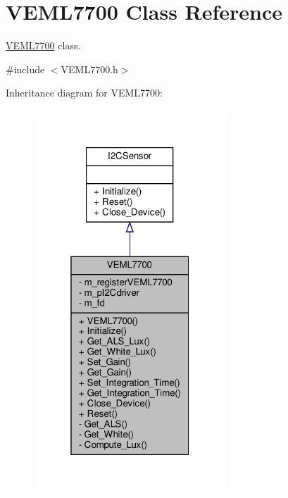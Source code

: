 \hypertarget{classVEML7700}{}\section{V\+E\+M\+L7700 Class Reference}
\label{classVEML7700}


\hyperlink{classVEML7700}{V\+E\+M\+L7700} class.  




{\ttfamily \#include $<$V\+E\+M\+L7700.\+h$>$}



Inheritance diagram for V\+E\+M\+L7700\+:\nopagebreak
\begin{figure}[H]
\begin{center}
\leavevmode
\includegraphics[width=205pt]{classVEML7700__inherit__graph}
\end{center}
\end{figure}


